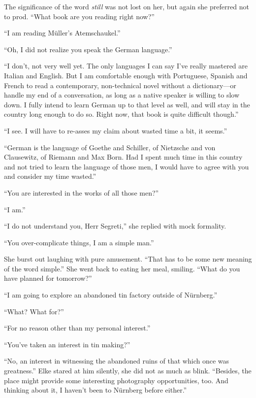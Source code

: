 The significance of the word \emph{still} was not lost on her, but again she preferred not to prod. ``What book are you reading right now?''

``I am reading Müller's Atemschaukel.''

``Oh, I did not realize you speak the German language.''

``I don't, not very well yet. The only languages I can say I've really mastered are Italian and English. But I am comfortable enough with Portuguese, Spanish and French to read a contemporary, non-technical novel without a dictionary---or handle my end of a conversation, as long as a native speaker is willing to slow down. I fully intend to learn German up to that level as well, and will stay in the country long enough to do so. Right now, that book is quite difficult though.''

``I see. I will have to re-asses my claim about wasted time a bit, it seems.''

``German is the language of \mbox{Goethe} and \mbox{Schiller}, of \mbox{Nietzsche} and von \mbox{Clausewitz}, of \mbox{Riemann} and Max Born. Had I spent much time in this country and not tried to learn the language of those men, I would have to agree with you and consider my time wasted.''

``You are interested in the works of all those men?''

``I am.''

``I do not understand you, Herr Segreti,'' she replied with mock formality.

``You over-complicate things, I am a simple man.''

She burst out laughing with pure amusement. ``That has to be some new meaning of the word simple.'' She went back to eating her meal, smiling. ``What do you have planned for tomorrow?''

``I am going to explore an abandoned tin factory outside of Nürnberg.''

``What? What for?''

``For no reason other than my personal interest.''

``You've taken an interest in tin making?''

``No, an interest in witnessing the abandoned ruins of that which once was greatness.'' Elke stared at him silently, she did not as much as blink. ``Besides, the place might provide some interesting photography opportunities, too. And thinking about it, I haven't been to Nürnberg before either.''

